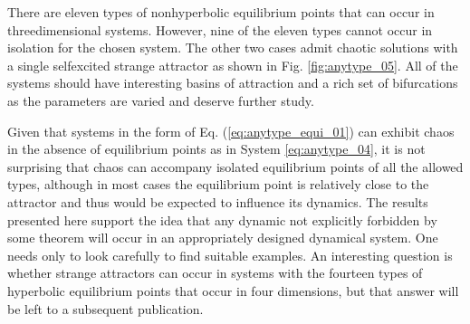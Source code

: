 There are eleven types of nonhyperbolic equilibrium points that can occur in threedimensional
systems. However, nine of the eleven types cannot occur in isolation for
the chosen system. The other two cases admit chaotic solutions with a single selfexcited
strange attractor as shown in Fig. \ref{fig:anytype_05}. All of the systems should have interesting
basins of attraction \cite{16Chaudhuri2014Complicated} and a rich set of bifurcations as the parameters are varied
and deserve further study.

Given that systems in the form of Eq. (\ref{eq:anytype_equi_01}) can exhibit chaos in the absence of
equilibrium points as in System \ref{eq:anytype_04}, it is not surprising that chaos can accompany
isolated equilibrium points of all the allowed types, although in most cases the equilibrium
point is relatively close to the attractor and thus would be expected to influence
its dynamics. The results presented here support the idea that any dynamic not explicitly
forbidden by some theorem will occur in an appropriately designed dynamical
system. One needs only to look carefully to find suitable examples. An interesting
question is whether strange attractors can occur in systems with the fourteen types
of hyperbolic equilibrium points that occur in four dimensions, but that answer will
be left to a subsequent publication.



